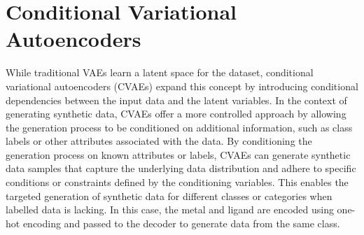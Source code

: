 \section{Conditional Variational Autoencoders}
While traditional VAEs learn a latent space for the dataset, conditional variational autoencoders (CVAEs) expand this concept by introducing conditional dependencies between the input data and the latent variables. In the context of generating synthetic data, CVAEs offer a more controlled approach by allowing the generation process to be conditioned on additional information, such as class labels or other attributes associated with the data.
By conditioning the generation process on known attributes or labels, CVAEs can generate synthetic data samples that capture the underlying data distribution and adhere to specific conditions or constraints defined by the conditioning variables. This enables the targeted generation of synthetic data for different classes or categories when labelled data is lacking. In this case, the metal and ligand are encoded using one-hot encoding and passed to the decoder to generate data from the same class. 
